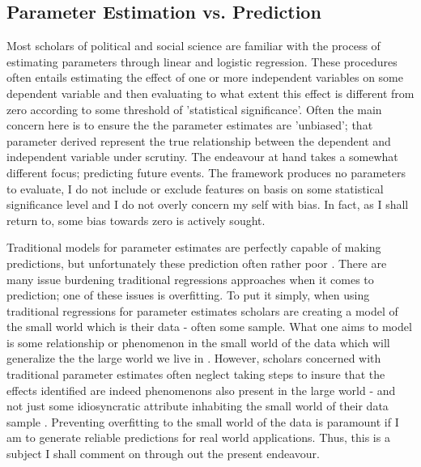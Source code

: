 \documentclass[a4paper]{article}
\begin{document}
\subsection{Parameter Estimation vs. Prediction}

Most scholars of political and social science are familiar with the process of estimating parameters through linear and logistic regression. These procedures often entails estimating the effect of one or more independent variables on some dependent variable and then evaluating to what extent this effect is different from zero according to some threshold of 'statistical significance'. Often the main concern here is to ensure the the parameter estimates are 'unbiased'; that parameter derived represent the true relationship between the dependent and independent variable under scrutiny. The endeavour at hand takes a somewhat different focus; predicting future events. The framework produces no parameters to evaluate, I do not include or exclude features on basis on some statistical significance level and I do not overly concern my self with bias. In fact, as I shall return to, some bias towards zero is actively sought.\par

Traditional models for parameter estimates are perfectly capable of making predictions, but unfortunately these prediction often rather poor \citep{Ward_Greenhill_Bakke_2010}. There are many issue burdening traditional regressions approaches when it comes to prediction; one of these issues is overfitting. To put it simply, when using traditional regressions for parameter estimates scholars are creating a model of the small world which is their data - often some sample. What one aims to model is some relationship or phenomenon in the small world of the data which will generalize the the large world we live in \citep{Mcelreath_2018}. However, scholars concerned with traditional parameter estimates often neglect taking steps to insure that the effects identified are indeed phenomenons also present in the large world - and not just some idiosyncratic attribute inhabiting the small world of their data sample \citep{Ward_Greenhill_Bakke_2010, Mcelreath_2018}. Preventing overfitting to the small world of the data is paramount if I am to generate reliable predictions for real world applications. Thus, this is a subject I shall comment on through out the present endeavour.\par
\end{document}
